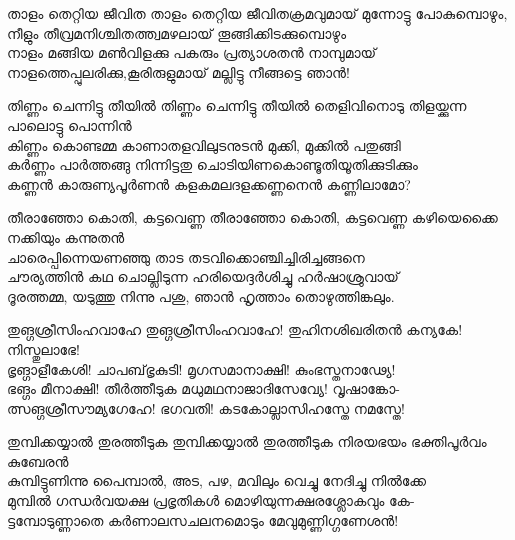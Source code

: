 \begin{enumerate}



\begin{slokam}{\VSv}{\HM}{താളം തെറ്റിയ ജീവിത}
താളം തെറ്റിയ ജീവിതക്രമവുമായ് മുന്നോട്ടു പോകുമ്പൊഴും,\\
നീളും തീവ്രമനിശ്ചിതത്ത്വമഴലായ് തൂങ്ങിക്കിടക്കുമ്പൊഴും\\
നാളം മങ്ങിയ മൺവിളക്കു പകരും പ്രത്യാശതൻ നാമ്പുമായ്\\
നാളത്തെപ്പുലരിക്കു,കൂരിരുളുമായ് മല്ലിട്ടു നീങ്ങട്ടെ ഞാൻ!
\end{slokam}


\begin{slokam}{\VSr}{\KAM}{തിണ്ണം ചെന്നിട്ടു തീയിൽ}
തിണ്ണം ചെന്നിട്ടു തീയിൽ തെളിവിനൊടു തിളയ്ക്കുന്ന പാലൊട്ടു പൊന്നിൻ\\
കിണ്ണം കൊണ്ടമ്മ കാണാതളവിലുടനുടൻ മുക്കി, മുക്കിൽ പതുങ്ങി\\
കർണ്ണം പാർത്തങ്ങു നിന്നിട്ടതു ചൊടിയിണകൊണ്ടൂതിയൂതിക്കുടിക്കും\\
കണ്ണൻ കാരുണ്യപൂർണൻ കളകമലദളക്കണ്ണനെൻ കണ്ണിലാമോ?
\end{slokam}



\begin{slokam}{\VSv}{\PCM}{തീരാഞ്ഞോ കൊതി, കട്ടവെണ്ണ}
തീരാഞ്ഞോ കൊതി, കട്ടവെണ്ണ കഴിയെക്കൈ നക്കിയും കന്നുതൻ\\
ചാരെപ്പിന്നെയണഞ്ഞു താട തടവിക്കൊഞ്ചിച്ചിരിച്ചങ്ങനെ\\
ചൗര്യത്തിൻ കഥ ചൊല്ലിടുന്ന ഹരിയെദ്ദർശിച്ചു ഹർഷാശ്രുവായ്‌\\
ദൂരത്തമ്മ, യടുത്തു നിന്നു പശു, ഞാൻ ഹൃത്താം തൊഴുത്തിങ്കലും.

\end{slokam}


\begin{slokam}{\VSr}{\KochT}{തുങ്ഗശ്രീസിംഹവാഹേ}
തുങ്ഗശ്രീസിംഹവാഹേ! തുഹിനശിഖരിതൻ കന്യകേ! നിസ്തുലാഭേ!\\
ഭൃങ്ഗാളീകേശി! ചാപബ്‌ഭൃകുടി! മൃഗസമാനാക്ഷി! കുംഭസ്തനാഢ്യേ!\\
ഭങ്ഗം മീനാക്ഷി! തീർത്തീടുക മധുമഥനാജാദിസേവ്യേ! വൃഷാങ്കോ-\\
ത്സങ്ഗശ്രീസൗമ്യഗേഹേ! ഭഗവതി! കടകോല്ലാസിഹസ്തേ നമസ്തേ!

\end{slokam}


\begin{slokam}{\VSr}{\Vyl}{തുമ്പിക്കയ്യാൽ തുരത്തീടുക}
തുമ്പിക്കയ്യാൽ തുരത്തീടുക നിരയഭയം ഭക്തിപൂർവം കുബേരൻ\\
കുമ്പിട്ടുണിന്നു പൈമ്പാൽ, അട, പഴ, മവിലും വെച്ചു നേദിച്ചു നിൽക്കേ\\
മുമ്പിൽ ഗന്ധർവയക്ഷ പ്രഭൃതികൾ മൊഴിയുന്നക്ഷരശ്ലോകവും കേ-\\
ട്ടമ്പോടുണ്ണാതെ കർണാലസചലനമൊടും മേവുമുണ്ണിഗ്ഗണേശൻ!
\end{slokam}


\end{enumerate}

